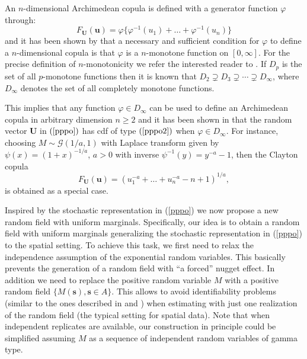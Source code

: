 \documentclass[times,sort&compress,3p]{elsarticle}
\theoremstyle{plain}%
\theoremstyle{definition}
\def\ss{\bm{s}}
\def\uu{\bm{u}}
\begin{document}
  An  $n$-dimensional Archimedean copula is defined with  a generator function  $\varphi$ through:
\begin{equation}\label{pppo2}
F_{\mathbf{U}}(\uu)=\varphi\{\varphi^{-1}(u_1)+\dots+\varphi^{-1}(u_n)\}
\end{equation}
and it has been shown  by  \citet{McNeil:2009} that a necessary and sufficient condition
for $\varphi$ to  define a $n$-dimensional copula
  is that $\varphi$  is a $n$-monotone  function on $[0,\infty]$.
 For the precise definition of $n$-monotonicity we refer the interested reader to \cite{Malov2001,McNeil:2009,Williamson:1956}.
If $D_p$ is the set of all $p$-monotone functions then  it is known that
$D_2 \supsetneq D_3 \supsetneq \cdots  \supsetneq D_{\infty}$, where $D_{\infty}$ denotes the set of all completely monotone functions.

This implies that any  function $\varphi \in D_{\infty}$ can be used to define an Archimedean copula in arbitrary dimension $n\geq2$ and
it has been shown in  \cite{MO1988} that the random vector $\mathbf{U}$ in $(\ref{pppo})$ has cdf of type  $(\ref{pppo2})$
when $\varphi \in D_{\infty}$.
For instance, choosing  $M\sim \mathcal{G}(1/a,1)$ with Laplace transform given by  $\psi(x)=(1+x)^{-1/a}$, $a>0$
with inverse $\psi^{-1}(y)=y^{-a}-1$, then the Clayton copula
\begin{equation*}\label{cck}
F_{\mathbf{U}}(\uu)= \left( u_{1}^{-a}+\dots+u_{n}^{-a}-n+1\right)^{1/a},
\end{equation*}
is obtained as a special case.

Inspired by the stochastic representation  in (\ref{pppo})
we now propose a new random field with uniform marginals. Specifically, our idea is to
obtain a random field with uniform marginals
generalizing the stochastic representation in (\ref{pppo})  to the spatial setting. To achieve this task, we first  need to relax  the independence assumption of the exponential random variables.
This basically  prevents the generation of a random field with ``a forced'' nugget effect. In addition we need to replace the positive random variable $M$ with a positive random field  $\{M(\ss), \ss \in A\}$. This  allows to avoid identifiability problems (similar to the ones described in \cite{genton:Zhang:2012} and \cite{bevilacqua2021non}) when estimating with just one realization of the random field (the typical setting for spatial data). Note that when independent replicates are available,
our construction  in principle  could be simplified assuming  $M$ as a sequence of independent random variables of gamma type.
\end{document}
